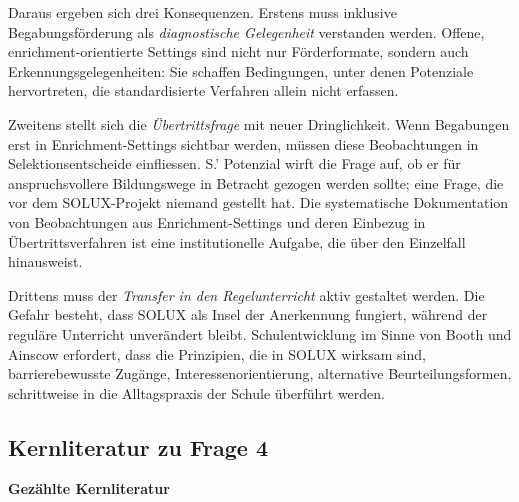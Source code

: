 \documentclass[ngerman, a4paper]{article}
\begin{document}
Daraus ergeben sich drei Konsequenzen. Erstens muss inklusive Begabungsförderung
als \textit{diagnostische Gelegenheit} verstanden werden. Offene, enrichment-orientierte
Settings sind nicht nur Förderformate, sondern auch Erkennungsgelegenheiten: Sie schaffen
Bedingungen, unter denen Potenziale hervortreten, die standardisierte Verfahren
allein nicht erfassen.

Zweitens stellt sich die \textit{Übertrittsfrage} mit neuer Dringlichkeit. Wenn
Begabungen erst in Enrichment-Settings sichtbar werden, müssen diese Beobachtungen
in Selektionsentscheide einfliessen. S.' Potenzial wirft die Frage auf, ob er für
anspruchsvollere Bildungswege in Betracht gezogen werden sollte; eine Frage, die vor
dem SOLUX-Projekt niemand gestellt hat. Die systematische Dokumentation von
Beobachtungen aus Enrichment-Settings und deren Einbezug in Übertrittsverfahren ist
eine institutionelle Aufgabe, die über den Einzelfall hinausweist.

Drittens muss der \textit{Transfer in den Regelunterricht} aktiv gestaltet werden.
Die Gefahr besteht, dass SOLUX als Insel der Anerkennung fungiert, während der
reguläre Unterricht unverändert bleibt. Schulentwicklung im Sinne von Booth und
Ainscow erfordert, dass die Prinzipien, die in SOLUX wirksam sind, barrierebewusste
Zugänge, Interessenorientierung, alternative Beurteilungsformen, schrittweise
in die Alltagspraxis der Schule überführt werden.

\subsection{Kernliteratur zu Frage 4}

\textbf{Gezählte Kernliteratur}
\end{document}
